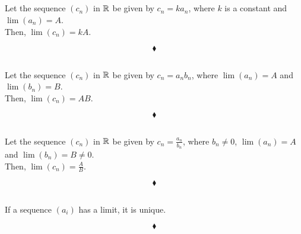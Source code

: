 \subsection{}
\begin{tcolorbox}
 Let the sequence $(c_n)$ in $\mathbb{R}$ be given by $c_n = ka_n$, where $k$ is a constant and $\lim (a_n)= A$.\\
 Then, $\lim (c_n)= kA$.
\end{tcolorbox}

$$\blacklozenge$$

\subsection{}
\begin{tcolorbox}
 Let the sequence $(c_n)$ in $\mathbb{R}$ be given by $c_n = a_nb_n$, where $\lim (a_n)= A$ and $\lim (b_n)= B$.\\
 Then, $\lim (c_n)= AB$. 
\end{tcolorbox}

$$\blacklozenge$$

\subsection{}
\begin{tcolorbox}
Let the sequence $(c_n)$ in $\mathbb{R}$ be given by $c_n = \frac{a_n}{b_n}$, where $b_n\neq 0$,  $\lim (a_n)= A$ and $\lim (b_n)= B\neq 0$.\\
 Then, $\lim (c_n)= \frac{A}{B}$.
\end{tcolorbox}

$$\blacklozenge$$

\subsection{}
\begin{tcolorbox}
If a sequence $(a_i)$ has a limit, it is unique.
\end{tcolorbox}

$$\blacklozenge$$
\newpage